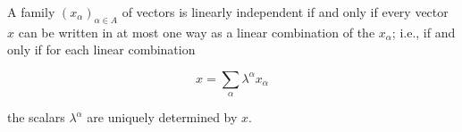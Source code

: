 A family $(x_{\alpha})_{\alpha \in A}$ of vectors is linearly independent if and only if every vector $x$ can be written in at most one way as a linear combination of the $x_{\alpha}$; i.e., if and only if for each linear combination

$$x = \sum_{\alpha} \lambda^{\alpha} x_{\alpha}$$

the scalars $\lambda^{\alpha}$ are uniquely determined by $x$.
